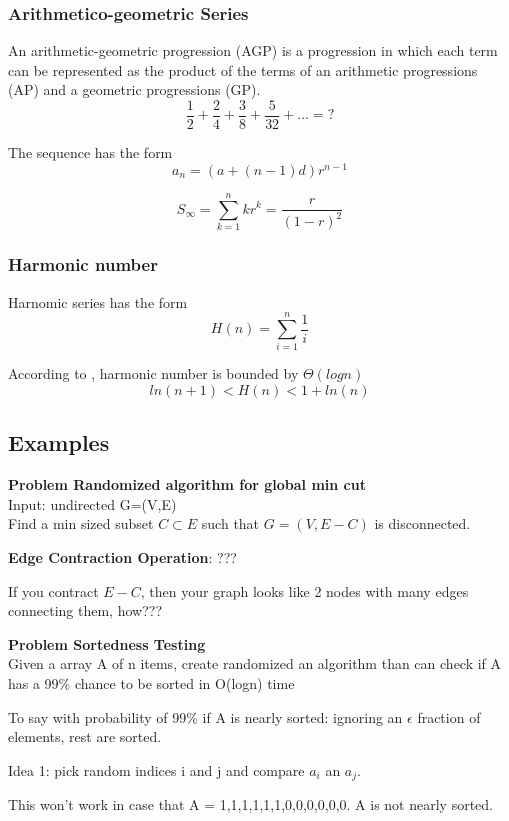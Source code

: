 \documentclass[12pt,article]{article}
\newenvironment{problem}[2][Problem]
    { \begin{mdframed}[backgroundcolor=gray!20] \textbf{#1 #2} \\}
    {  \end{mdframed}}
\begin{document}
\subsubsection{Arithmetico-geometric Series}

An arithmetic-geometric progression (AGP) is a progression in which each term can be represented as the product of the terms of an arithmetic progressions (AP) and a geometric progressions (GP).
$$\frac{1}{2} + \frac{2}{4} + \frac{3}{8} + \frac{5}{32} + ... = ?$$

The sequence has the form
$$a_n = (a + (n-1)d)r^{n-1}$$

$$S_{\infty} = \sum^n_{k=1} kr^k = \frac{r}{(1-r)^2}$$

\subsubsection{Harmonic number}
Harnomic series has the form
$$H(n) = \sum_{i=1}^{n} \frac{1}{i}$$

According to \cite{kleinbergalgorithm}, harmonic number is bounded by $\Theta(logn)$
$$ln(n + 1) < H(n) < 1 + ln(n)$$


\subsection{Examples}

\begin{problem}{Randomized algorithm for global min cut} 
Input: undirected G=(V,E)\\
Find a min sized subset $C \subset E$ such that $G = (V,E - C)$ is disconnected.
\end{problem}

\textbf{Edge Contraction Operation}: ???

If you contract $E - C$, then your graph looks like 2 nodes with many edges connecting them, how???

\begin{problem}{Sortedness Testing} 
Given a array A of n items, create randomized an algorithm than can check if A has a 99\% chance to be sorted in O(logn) time
\end{problem}

To say with probability of 99\% if A is nearly sorted: ignoring an $\epsilon$ fraction of elements, rest are sorted.

Idea 1: pick random indices i and j and compare $a_i$ an $a_j$.

This won't work in case that A = 1,1,1,1,1,1,0,0,0,0,0,0. A is not nearly sorted.
\end{document}
